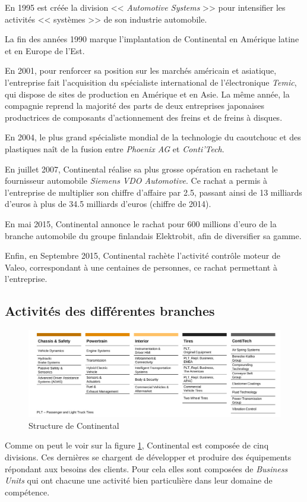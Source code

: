 En 1995 est créée la division << \textit{Automotive Systems} >> pour intensifier les activités << systèmes >> de son industrie automobile.

La fin des années 1990 marque l'implantation de Continental en Amérique latine et en Europe de l'Est.

En 2001, pour renforcer sa position sur les marchés américain et asiatique, l'entreprise fait l'acquisition du spécialiste international de l'électronique \textit{Temic}, qui dispose de sites de production en Amérique et en Asie. La même année, la compagnie reprend la majorité des parts de deux entreprises japonaises productrices de composants d'actionnement des freins et de freins à disques. 

En 2004, le plus grand spécialiste mondial de la technologie du caoutchouc et des plastiques naît de la fusion entre \textit{Phoenix AG} et \textit{Conti'Tech}.

En juillet 2007, Continental réalise sa plus grosse opération en rachetant le fournisseur automobile \textit{Siemens VDO Automotive}. Ce rachat a permis à l'entreprise de multiplier son chiffre d'affaire par 2.5, passant ainsi de 13 milliards d'euros à plus de 34.5 milliards d'euros (chiffre de 2014).

En mai 2015, Continental annonce le rachat pour 600 millions d'euro de la branche automobile du groupe finlandais Elektrobit, afin de diversifier sa gamme.

Enfin, en Septembre 2015, Continental rachète l'activité contrôle moteur de Valeo, correspondant à une centaines de personnes, ce rachat permettant à l'entreprise.
		
		\subsection{Activités des différentes branches}
		\begin{figure}[H]
			\hspace{-55px}
			\includegraphics[width=21cm]{contents/images/structureConti.jpg}
			\caption{Structure de Continental}
			\label{fig:structConti}
		\end{figure}
\newpage
		Comme on peut le voir sur la figure \ref{fig:structConti}, Continental est composée de cinq divisions. Ces dernières se chargent de développer et produire des équipements répondant aux besoins des clients. Pour cela elles sont composées de \textit{Business Units} qui ont chacune une activité bien particulière dans leur domaine de compétence. 

